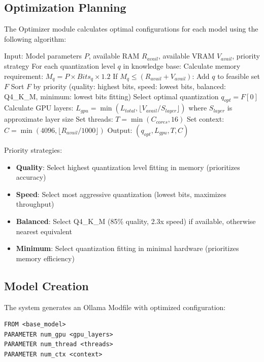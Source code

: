 \documentclass[journal]{IEEEtran}
\begin{document}
\subsection{Optimization Planning}

The Optimizer module calculates optimal configurations for each model using the following algorithm:

\begin{algorithmic}
\STATE Input: Model parameters $P$, available RAM $R_{avail}$, available VRAM $V_{avail}$, priority strategy
\STATE For each quantization level $q$ in knowledge base:
\STATE Calculate memory requirement: $M_q = P \times Bits_q \times 1.2$
\STATE If $M_q \leq (R_{avail} + V_{avail})$: Add $q$ to feasible set $F$
\STATE Sort $F$ by priority (quality: highest bits, speed: lowest bits, balanced: Q4\_K\_M, minimum: lowest bits fitting)
\STATE Select optimal quantization $q_{opt} = F[0]$
\STATE Calculate GPU layers: $L_{gpu} = \min(L_{total}, \lfloor V_{avail} / S_{layer} \rfloor)$ where $S_{layer}$ is approximate layer size
\STATE Set threads: $T = \min(C_{cores}, 16)$
\STATE Set context: $C = \min(4096, \lfloor R_{avail} / 1000 \rfloor)$
\STATE Output: $(q_{opt}, L_{gpu}, T, C)$
\end{algorithmic}

Priority strategies:
\begin{itemize}
    \item \textbf{Quality}: Select highest quantization level fitting in memory (prioritizes accuracy)
    \item \textbf{Speed}: Select most aggressive quantization (lowest bits, maximizes throughput)
    \item \textbf{Balanced}: Select Q4\_K\_M (85\% quality, 2.3x speed) if available, otherwise nearest equivalent
    \item \textbf{Minimum}: Select quantization fitting in minimal hardware (prioritizes memory efficiency)
\end{itemize}

\subsection{Model Creation}

The system generates an Ollama Modfile with optimized configuration:
\begin{verbatim}
FROM <base_model>
PARAMETER num_gpu <gpu_layers>
PARAMETER num_thread <threads>
PARAMETER num_ctx <context>
\end{verbatim}
\end{document}
